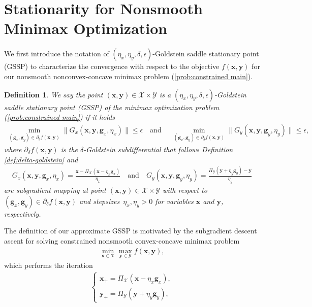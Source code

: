 \documentclass[11pt]{article}
\def\vg{\mathbf{g}}
\def\vx{\mathbf{x}}
\def\vy{\mathbf{y}}
\def\fX{{\mathcal{X}}}
\def\fY{{\mathcal{Y}}}
\newtheorem{definition}{Definition}
\begin{document}
\section{Stationarity for Nonsmooth Minimax Optimization}\label{Sec: The stationary points}



We first introduce the notation of $(\eta_x,\eta_y,\delta, \epsilon)$-Goldstein saddle stationary point (GSSP) to characterize the convergence with respect to the objective $f(\vx,\vy)$ for our nonsmooth nonconvex-concave minimax problem (\ref{prob:constrained main}).

\begin{definition}\label{def:GSSP}
    We say the point $(\vx,\vy)\in\mathcal{X}\times\mathcal{Y}$ is a $(\eta_x,\eta_y,\delta, \epsilon)$-Goldstein saddle stationary point (GSSP) of the minimax optimization problem (\ref{prob:constrained main}) if it holds
    \begin{align*}
        \min_{(\vg_x, \vg_y) \in \partial_\delta f(\vx,\vy)} \| G_x(\vx,\vy, \vg_{x}, \eta_x) \| \leq \epsilon
        \quad\text{and}~~
        \quad\min_{(\vg_x, \vg_y) \in \partial_\delta f(\vx,\vy)} \| G_y(\vx,\vy, \vg_{y}, \eta_y) \| \leq \epsilon,
    \end{align*}
    where $\partial_\delta f(\vx,\vy)$ is the $\delta$-Goldstein subdifferential that follows Definition \ref{def:delta-goldstein} and
    \begin{align}\label{eq:gradient-mapping-xy}
        G_x(\vx, \vy,\vg_{x},\eta_x) = \frac{\vx-\Pi_\mathcal{X}\left(\vx - \eta_x \vg_{x}\right) }{\eta_x}
        \quad\text{and}\quad
        G_y(\vx, \vy,\vg_{y},\eta_y) = \frac{\Pi_\mathcal{Y}\left(\vy + \eta_y \vg_{y}\right) - \vy}{\eta_y}
    \end{align}
    are subgradient mapping at point $(\vx,\vy)\in\fX\times\fY$ with respect to $(\vg_x, \vg_y) \in \partial_\delta f(\vx,\vy)$ and stepsizes~$\eta_x,\eta_y>0$ for variables $\vx$ and  $\vy$, respectively.
\end{definition}
The definition of our approximate GSSP is motivated by the subgradient descent ascent for solving constrained nonsmooth convex-concave minimax problem 
\begin{align*}
    \min_{\vx\in\mathcal{X}}\max_{\vy\in\mathcal{Y}}f(\vx,\vy),
\end{align*}
which performs the iteration
\begin{align}\label{eq:subgradient-iteration}
    \begin{cases}
        \vx_+ = \Pi_\mathcal{X}\left(\vx - \eta_x\vg_{x}\right), \\[0.1cm]
        \vy_+ = \Pi_\mathcal{Y}\left(\vy + \eta_y \vg_{y}\right),
    \end{cases}
\end{align}
\end{document}
